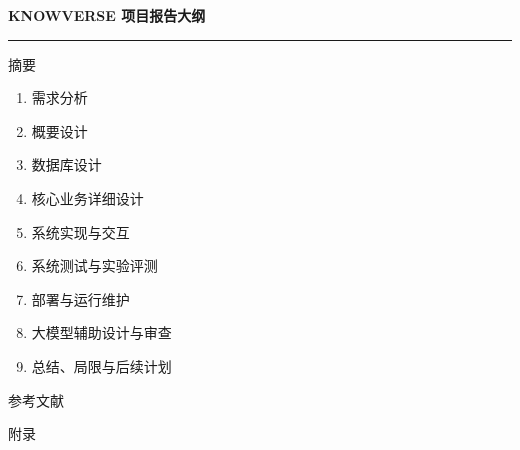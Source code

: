 \documentclass[12pt,a4paper,UTF8]{ctexart}
\begin{document}
{\bfseries\color{OutlineBlue} KNOWVERSE 项目报告大纲\par}
\vspace{4mm}
{\color{OutlineBlue!28}\rule{\linewidth}{0.55pt}\par}
\vspace{8mm}

{
摘要\par
\begin{enumerate}[
  label=\textcolor{OutlineBlue}{\arabic*.},
  leftmargin=1.9em,
  itemsep=3.3mm,
  topsep=4mm,
  parsep=0pt]
  \item 需求分析
  \item 概要设计
  \item 数据库设计
  \item 核心业务详细设计
  \item 系统实现与交互
  \item 系统测试与实验评测
  \item 部署与运行维护
  \item 大模型辅助设计与审查
  \item 总结、局限与后续计划
\end{enumerate}
参考文献\par
\vspace{3.3mm}
附录\par
}
\end{document}
